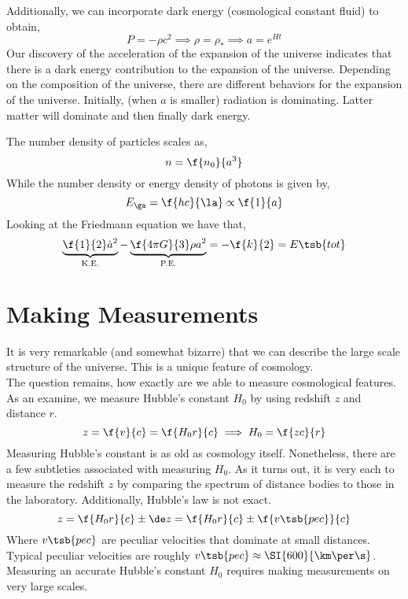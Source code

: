 \documentclass{article}
\begin{document}
Additionally, we can incorporate dark energy (cosmological constant fluid) to obtain,
\[ P = - \rho c^2 \implies \rho = \rho_{*} \implies a = e^{Ht}\]
Our discovery of the acceleration of the expansion of the universe indicates that there is a dark energy contribution to the expansion of the universe. Depending on the composition of the universe, there are different behaviors for the expansion of the universe. Initially, (when $a$ is smaller) radiation is dominating. Latter matter will dominate and then finally dark energy.
\begin{center}
\end{center}
The number density of particles scales as,
\[ n = \f{n_0}{a^3} \]
While the number density or energy density of photons is given by,
\[ E_{\ga} = \f{hc}{\la} \propto \f{1}{a} \]
Looking at the Friedmann equation we have that,
\[ \underbrace{\f{1}{2} \dot a^2}_{\text{K.E.}} - \underbrace{\f{4 \pi G}{3} \rho a^2}_{\text{P.E.}} = -\f{k}{2} = E\tsb{tot} \]
\section{Making Measurements}
It is very remarkable (and somewhat bizarre) that we can describe the large scale structure of the universe. This is a unique feature of cosmology. \\

The question remains, how exactly are we able to measure cosmological features. As an examine, we measure Hubble's constant $H_{0}$ by using redshift $z$ and distance $r$.
\[ z = \f{v}{c} = \f{H_0 r}{c} \implies H_0 = \f{zc}{r} \]
Measuring Hubble's constant is as old as cosmology itself. Nonetheless, there are a few subtleties associated with measuring $H_0$. As it turns out, it is very each to measure the redshift $z$ by comparing the spectrum of distance bodies to those in the laboratory. Additionally, Hubble's law is not exact.
\[ z = \f{H_0 r}{c} \pm \de z = \f{H_0 r}{c} \pm \f{v\tsb{pec}}{c} \]
Where $v\tsb{pec}$ are peculiar velocities that dominate at small distances. Typical peculiar velocities are roughly $v\tsb{pec} \approx \SI{600}{\km \per \s}$. Measuring an accurate Hubble's constant $H_0$ requires making measurements on very large scales. \\
\end{document}
